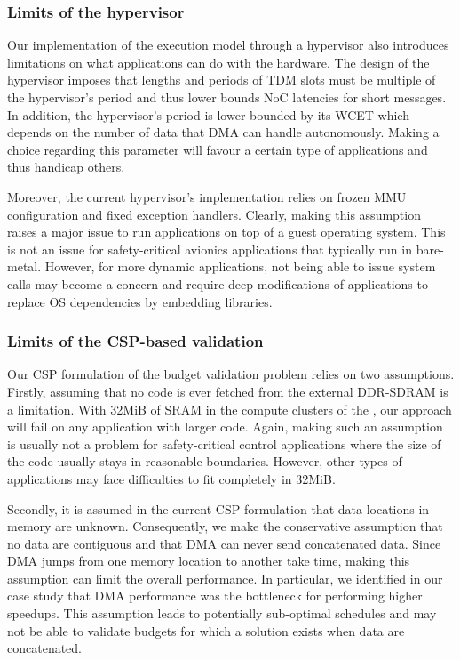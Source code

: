 \documentclass[main.tex]{subfiles}
\begin{document}
\subsubsection{Limits of the hypervisor}
Our implementation of the execution model through a hypervisor also introduces limitations on what applications can do with the hardware. The design of the hypervisor imposes that lengths and periods of TDM slots must be multiple of the hypervisor's period and thus lower bounds NoC latencies for short messages. In addition, the hypervisor's period is lower bounded by its WCET which depends on the number of data that DMA can handle autonomously. Making a choice regarding this parameter will favour a certain type of applications and thus handicap others.

Moreover, the current hypervisor's implementation relies on frozen MMU configuration and fixed exception handlers. Clearly, making this assumption raises a major issue to run applications on top of a guest operating system. This is not an issue for safety-critical avionics applications that typically run in bare-metal. However, for more dynamic applications, not being able to issue system calls may become a concern and require deep modifications of applications to replace OS dependencies by embedding libraries. 

\subsubsection{Limits of the CSP-based validation}
Our CSP formulation of the budget validation problem relies on two assumptions. 
Firstly, assuming that no code is ever fetched from the external DDR-SDRAM is a limitation. With 32MiB of SRAM in the compute clusters of the \mppalong, our approach will fail on any application with larger code. Again, making such an assumption is usually not a problem for safety-critical control applications where the size of the code usually stays in reasonable boundaries. However, other types of applications may face difficulties to fit completely in 32MiB.

Secondly, it is assumed in the current CSP formulation that data locations in memory are unknown. Consequently, we make the conservative assumption that no data are contiguous and that DMA can never send concatenated data. Since DMA jumps from one memory location to another take time, making this assumption can limit the overall performance. In particular, we identified in our case study that DMA performance was the bottleneck for performing higher speedups. This assumption leads to potentially sub-optimal schedules and may not be able to validate budgets for which a solution exists when data are concatenated.\\
\end{document}
